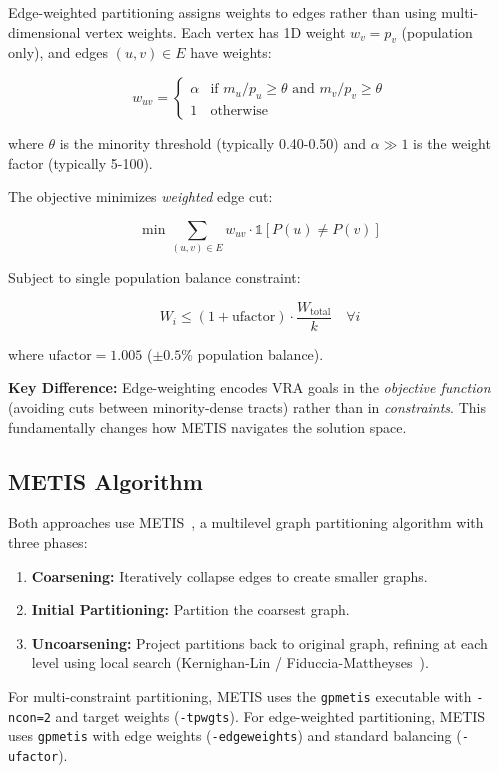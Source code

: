 Edge-weighted partitioning assigns weights to edges rather than using multi-dimensional vertex weights. Each vertex has 1D weight $w_v = p_v$ (population only), and edges $(u,v) \in E$ have weights:

\begin{equation}
w_{uv} = \begin{cases}
\alpha & \text{if } m_u/p_u \geq \theta \text{ and } m_v/p_v \geq \theta \\
1 & \text{otherwise}
\end{cases}
\end{equation}

where $\theta$ is the minority threshold (typically 0.40-0.50) and $\alpha \gg 1$ is the weight factor (typically 5-100).

The objective minimizes \textit{weighted} edge cut:

\begin{equation}
\min \sum_{(u,v) \in E} w_{uv} \cdot \mathbb{1}[P(u) \neq P(v)]
\end{equation}

Subject to single population balance constraint:

\begin{equation}
W_i \leq (1 + \text{ufactor}) \cdot \frac{W_{\text{total}}}{k} \quad \forall i
\end{equation}

where $\text{ufactor} = 1.005$ ($\pm0.5\%$ population balance).

\textbf{Key Difference:} Edge-weighting encodes VRA goals in the \textit{objective function} (avoiding cuts between minority-dense tracts) rather than in \textit{constraints}. This fundamentally changes how METIS navigates the solution space.

\subsection{METIS Algorithm}

Both approaches use METIS~\cite{karypis1998fast}, a multilevel graph partitioning algorithm with three phases:

\begin{enumerate}
    \item \textbf{Coarsening:} Iteratively collapse edges to create smaller graphs.
    \item \textbf{Initial Partitioning:} Partition the coarsest graph.
    \item \textbf{Uncoarsening:} Project partitions back to original graph, refining at each level using local search (Kernighan-Lin / Fiduccia-Mattheyses~\cite{fiduccia1982linear}).
\end{enumerate}

For multi-constraint partitioning, METIS uses the \texttt{gpmetis} executable with \texttt{-ncon=2} and target weights (\texttt{-tpwgts}). For edge-weighted partitioning, METIS uses \texttt{gpmetis} with edge weights (\texttt{-edgeweights}) and standard balancing (\texttt{-ufactor}).
